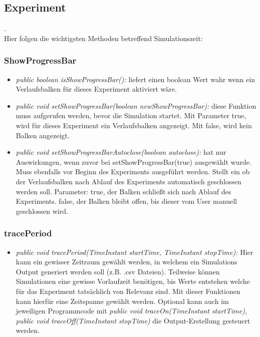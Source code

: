 \documentclass[runningheads]{llncs}
\begin{document}
\subsection{Experiment}
.\\
Hier folgen die wichtigsten Methoden betreffend Simulationszeit:
\subsubsection{ShowProgressBar}
\begin{itemize}
\item \textit{public boolean isShowProgressBar():} liefert einen boolean Wert wahr wenn ein Verlaufsbalken für dieses Experiment aktiviert wäre.
\item \textit{public void setShowProgressBar(boolean newShowProgressBar):} diese Funktion muss aufgerufen werden, bevor die Simulation startet. Mit Parameter true, wird für dieses Experiment ein Verlaufsbalken angezeigt. Mit false, wird kein Balken angezeigt.
\item \textit{public void setShowProgressBarAutoclose(boolean autoclose):} hat nur Auswirkungen, wenn zuvor bei setShowProgressBar(true) ausgewählt wurde. Muss ebenfalls vor Beginn des Experiments ausgeführt werden. Stellt ein ob der Verlaufsbalken nach Ablauf des Experiments automatisch geschlossen werden soll. Parameter: true, der Balken schließt sich nach Ablauf des Experiments. false, der Balken bleibt offen, bis dieser vom User manuell geschlossen wird.
\end{itemize}

\subsubsection{tracePeriod}
\begin{itemize}
\item \textit{public void tracePeriod(TimeInstant startTime, TimeInstant stopTime):} Hier kann ein gewisser Zeitraum gewählt werden, in welchem ein Simulations Output generiert werden soll (z.B. .csv Dateien). Teilweise können Simulationen eine gewisse Vorlaufzeit benötigen, bis Werte entstehen welche für das Experiment tatsächlich von Relevanz sind. Mit dieser Funktionen kann hierfür eine Zeitspanne gewählt werden. Optional kann auch im jeweiligen Programmcode mit \textit{public void traceOn(TimeInstant startTime), public void traceOff(TimeInstant stopTime)} die Output-Erstellung gesteuert werden.
\end{itemize}
\end{document}
